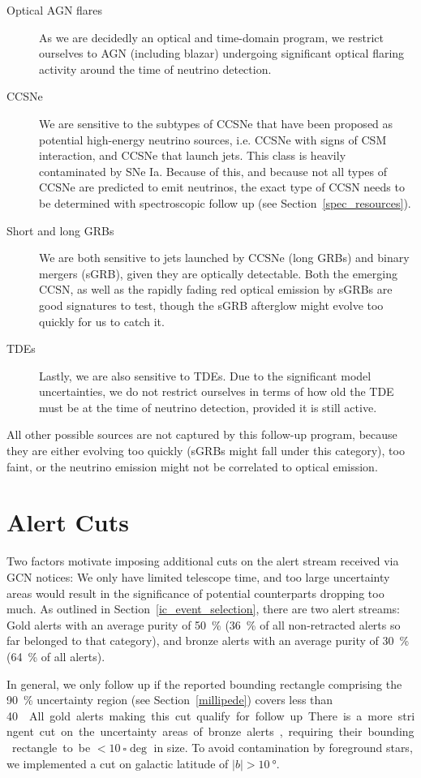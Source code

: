 \begin{description}
    \item[Optical AGN flares] As we are decidedly an optical and time-domain program, we restrict ourselves to AGN (including blazar) undergoing significant optical flaring activity around the time of neutrino detection.
    \item[CCSNe] We are sensitive to the subtypes of CCSNe that have been proposed as potential high-energy neutrino sources, i.e. CCSNe with signs of CSM interaction, and CCSNe that launch jets. This class is heavily contaminated by SNe Ia. Because of this, and because not all types of CCSNe are predicted to emit neutrinos, the exact type of CCSN needs to be determined with spectroscopic follow up (see Section~\ref{spec_resources}).
    \item[Short and long GRBs] We are both sensitive to jets launched by CCSNe (long GRBs) and binary mergers (sGRB), given they are optically detectable. Both the emerging CCSN, as well as the rapidly fading red optical emission by sGRBs are good signatures to test, though the sGRB afterglow might evolve too quickly for us to catch it.
    \item[TDEs] Lastly, we are also sensitive to TDEs. Due to the significant model uncertainties, we do not restrict ourselves in terms of how old the TDE must be at the time of neutrino detection, provided it is still active.
\end{description}
All other possible sources are not captured by this follow-up program, because they are either evolving too quickly (sGRBs might fall under this category), too faint, or the neutrino emission might not be correlated to optical emission.

\section{Alert Cuts}\label{alert_cuts}
Two factors motivate imposing additional cuts on the alert stream received via GCN notices: We only have limited telescope time, and too large uncertainty areas would result in the significance of potential counterparts dropping too much. As outlined in Section~\ref{ic_event_selection}, there are two alert streams: Gold alerts with an average purity of \SI{50}{\percent} (\SI{36}{\percent} of all non-retracted alerts so far belonged to that category), and bronze alerts with an average purity of \SI{30}{\percent} (\SI{64}{\percent} of all alerts).

In general, we only follow up if the reported bounding rectangle comprising the \SI{90}{\percent} uncertainty region (see Section~\ref{millipede}) covers less than \SI{40}{\square\deg}. All gold alerts making this cut qualify for follow up. There is a more stringent cut on the uncertainty areas of bronze alerts, requiring their bounding rectangle to be $<\SI{10}{\square\deg}$ in size. To avoid contamination by foreground stars, we implemented a cut on galactic latitude of $|b|>\SI{10}{\degree}$.

